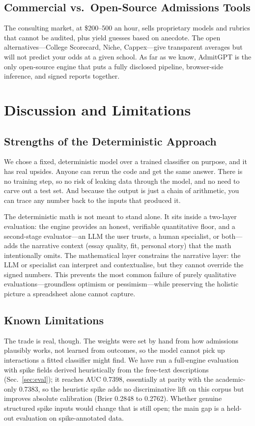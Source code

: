 \documentclass[conference]{IEEEtran}
\begin{document}
\subsection{Commercial vs.\ Open-Source Admissions Tools}
The consulting market, at \$200--500 an hour, sells proprietary models and rubrics that cannot be audited, plus yield guesses based on anecdote. The open alternatives---College Scorecard, Niche, Cappex---give transparent averages but will not predict your odds at a given school. As far as we know, AdmitGPT is the only open-source engine that puts a fully disclosed pipeline, browser-side inference, and signed reports together.

\section{Discussion and Limitations}
\subsection{Strengths of the Deterministic Approach}
We chose a fixed, deterministic model over a trained classifier on purpose, and it has real upsides. Anyone can rerun the code and get the same answer. There is no training step, so no risk of leaking data through the model, and no need to carve out a test set. And because the output is just a chain of arithmetic, you can trace any number back to the inputs that produced it.

The deterministic math is not meant to stand alone. It sits inside a two-layer evaluation: the engine provides an honest, verifiable quantitative floor, and a second-stage evaluator---an LLM the user trusts, a human specialist, or both---adds the narrative context (essay quality, fit, personal story) that the math intentionally omits. The mathematical layer constrains the narrative layer: the LLM or specialist can interpret and contextualise, but they cannot override the signed numbers. This prevents the most common failure of purely qualitative evaluations---groundless optimism or pessimism---while preserving the holistic picture a spreadsheet alone cannot capture.

\subsection{Known Limitations}
The trade is real, though. The weights were set by hand from how admissions plausibly works, not learned from outcomes, so the model cannot pick up interactions a fitted classifier might find. We have run a full-engine evaluation with spike fields derived heuristically from the free-text descriptions (Sec.~\ref{sec:eval}); it reaches AUC 0.7398, essentially at parity with the academic-only 0.7383, so the heuristic spike adds no discriminative lift on this corpus but improves absolute calibration (Brier 0.2848 to 0.2762). Whether genuine structured spike inputs would change that is still open; the main gap is a held-out evaluation on spike-annotated data.
\end{document}
